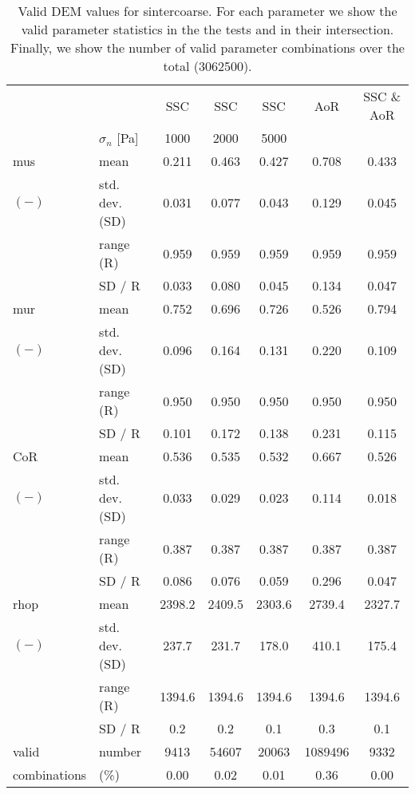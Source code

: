 \begin{table}[htbp] 
 \centering 
\begin{tabular}{ll|ccccc} 
 \hline 
 &    & SSC & SSC & SSC & AoR   & SSC \& AoR \\ 
 & $\sigma_n$  [Pa]  & 1000 & 2000 & 5000 &   &  \\ 
 \hline 
\acs{mus} & mean & 0.211 & 0.463 & 0.427 & 0.708 & 0.433 \\ 
$(-)$ & std. dev. (SD) & 0.031 & 0.077 & 0.043 & 0.129 & 0.045 \\ 
 & range (\acs{R}) & 0.959 & 0.959 & 0.959 & 0.959 & 0.959 \\ 
 & SD / R & 0.033 & 0.080 & 0.045 & 0.134 & 0.047 \\ 
 \hline 
\acs{mur} & mean & 0.752 & 0.696 & 0.726 & 0.526 & 0.794 \\ 
$(-)$ & std. dev. (SD) & 0.096 & 0.164 & 0.131 & 0.220 & 0.109 \\ 
 & range (\acs{R}) & 0.950 & 0.950 & 0.950 & 0.950 & 0.950 \\ 
 & SD / R & 0.101 & 0.172 & 0.138 & 0.231 & 0.115 \\ 
 \hline 
\acs{CoR} & mean & 0.536 & 0.535 & 0.532 & 0.667 & 0.526 \\ 
$(-)$ & std. dev. (SD) & 0.033 & 0.029 & 0.023 & 0.114 & 0.018 \\ 
 & range (\acs{R}) & 0.387 & 0.387 & 0.387 & 0.387 & 0.387 \\ 
 & SD / R & 0.086 & 0.076 & 0.059 & 0.296 & 0.047 \\ 
 \hline 
\acs{rhop} & mean & 2398.2 & 2409.5 & 2303.6 & 2739.4 & 2327.7 \\ 
$(-)$ & std. dev. (SD) & 237.7 & 231.7 & 178.0 & 410.1 & 175.4 \\ 
 & range (\acs{R}) & 1394.6 & 1394.6 & 1394.6 & 1394.6 & 1394.6 \\ 
 & SD / R &  0.2 &  0.2 &  0.1 &  0.3 &  0.1 \\ 
 \hline 
valid & number & 9413 & 54607 & 20063 & 1089496 & 9332 \\ 
combinations & (\%)  & 0.00 & 0.02 & 0.01 & 0.36 & 0.00 \\ 
 \hline 
\end{tabular} 
\caption[Valid DEM values for sintercoarse]{Valid DEM values for sintercoarse. 
For each parameter we show the valid parameter statistics in the the tests and in their 
intersection. Finally, we show the number of valid parameter combinations over the total (3062500).} 
\label{tab:31DEMvalidvaluessintercoarse} 
\end{table}